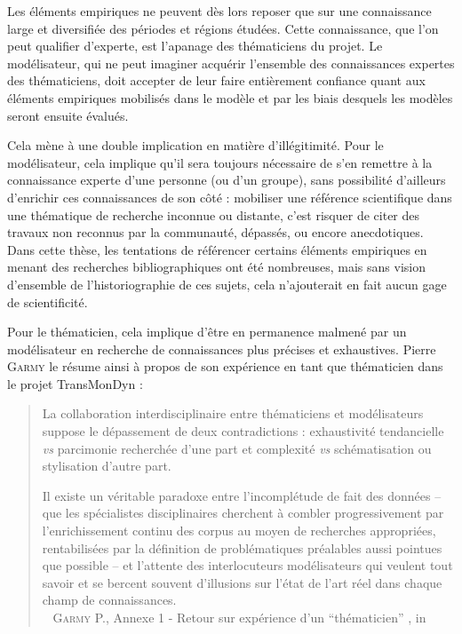 Les éléments empiriques ne peuvent dès lors reposer que sur une connaissance large et diversifiée des périodes et régions étudées.
Cette connaissance, que l'on peut qualifier d'experte, est l'apanage des \og thématiciens\fg{} du projet.
Le modélisateur, qui ne peut imaginer acquérir l'ensemble des connaissances expertes des thématiciens, doit accepter de leur faire entièrement confiance quant aux éléments empiriques mobilisés dans le modèle et par les biais desquels les modèles seront ensuite évalués.

Cela mène à une double implication en matière d'illégitimité.
Pour le modélisateur, cela implique qu'il sera toujours nécessaire de s'en remettre à la connaissance experte d'une personne (ou d'un groupe), sans possibilité d'ailleurs d'enrichir ces connaissances de son côté : mobiliser une référence scientifique dans une thématique de recherche inconnue ou distante, c'est risquer de citer des travaux non reconnus par la communauté, dépassés, ou encore anecdotiques.
Dans cette thèse, les tentations de référencer certains éléments empiriques en menant des recherches bibliographiques ont été nombreuses, mais sans vision d'ensemble de l'historiographie de ces sujets, cela n'ajouterait en fait aucun gage de scientificité.

Pour le thématicien, cela implique d'être en permanence \og malmené\fg{} par un modélisateur en recherche de connaissances plus précises et exhaustives.
Pierre \textsc{Garmy} le résume ainsi à propos de son expérience en tant que thématicien dans le projet TransMonDyn :
\begin{quotation}
\noindent \og La collaboration interdisciplinaire entre thématiciens et modélisateurs suppose le dépassement de deux contradictions : exhaustivité tendancielle \textit{vs} parcimonie recherchée d’une part et complexité \textit{vs} schématisation ou stylisation d’autre part.

\noindent Il existe un véritable paradoxe entre l’incomplétude de fait des données -- que les spécialistes disciplinaires cherchent à combler progressivement par l’enrichissement continu des corpus au moyen de recherches appropriées, rentabilisées par la définition de problématiques préalables aussi pointues que possible -- et l’attente des interlocuteurs modélisateurs qui veulent tout savoir et se bercent souvent d’illusions sur l’état de l’art réel dans chaque champ de connaissances. \fg{} \\
\mbox{}~ \textsc{Garmy} P., \og Annexe 1 - Retour sur expérience d’un “thématicien” \fg{}, in \textcite[476]{ouriachi_lelaboration_2017}  	  
\end{quotation}

